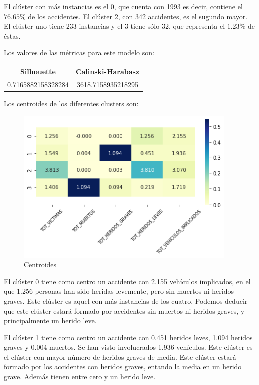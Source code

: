 \documentclass[a4]{article}
\begin{document}
\vspace{-3mm}

El clúster con más instancias es el 0, que cuenta con 1993 es decir, contiene el $76.65\%$ de los accidentes. El clúster 2, con 342 accidentes, es el sugundo mayor. El clúster uno tiene 233 instancias y el 3 tiene sólo 32, que representa el $1.23\%$ de éstas.

Los valores de las métricas para este modelo son:

\begin{center}
\begin{tabular}{|c|c|}
\hline
\multicolumn{1}{|c|}{\textbf{Silhouette}} & \textbf{Calinski-Harabasz}\\ \hline
  0.7165882158328284 & 3618.7158935218295  \\ \hline
\end{tabular}
\end{center}

Los centroides de los diferentes clusters son:

\vspace{-3mm}

\begin{figure}[H]
  \centering
  \caption{Centroides}
  \includegraphics[width=106mm]{imagenes/c3_kmeans_centroides}
\end{figure}

El clúster 0 tiene como centro un accidente con 2.155 vehículos implicados, en el que 1.256 personas han sido heridas levemente, pero sin muertos ni heridos graves. Este clúster es aquel con más instancias de los cuatro. Podemos deducir que este clúster estará formado por accidentes sin muertos ni heridos graves, y principalmente un herido leve.

El clúster 1 tiene como centro un accidente con 0.451 heridos leves, 1.094 heridos graves y 0.004 muertos. Se han visto involucrados 1.936 vehículos. Este clúster es el clúster con mayor número de heridos graves de media. Este clúster estará formado por los accidentes con heridos graves, entando la media en un herido grave. Además tienen entre cero y un herido leve.
\end{document}
